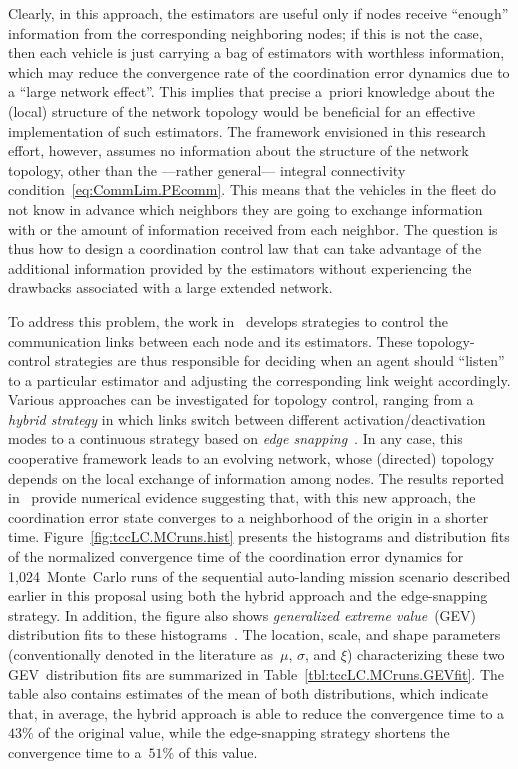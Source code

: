 \documentclass[letter,onecolumn,12pt]{aiaa-tc}
\newcommand{\1}{1_n}
\begin{document}
Clearly, in this approach, the estimators are useful only if nodes receive ``enough'' information from the corresponding neighboring nodes; if this is not the case, then each vehicle is just carrying a bag of estimators with worthless information, which may reduce the convergence rate of the coordination error dynamics due to a ``large network effect''. This implies that precise a~priori knowledge about the (local) structure of the network topology would be beneficial for an effective implementation of such estimators. The framework envisioned in this research effort, however, assumes no information about the structure of the network topology, other than the ---rather general--- integral connectivity condition~\eqref{eq:CommLim.PEcomm}. This means that the vehicles in the fleet do not know in advance which neighbors they are going to exchange information with or the amount of information received from each neighbor. The question is thus how to design a coordination control law that can take advantage of the additional information provided by the estimators without experiencing the drawbacks associated with a large extended network.


To address this problem, the work in~\cite{XargayPhd} develops strategies to control the communication links between each node and its estimators. These topology-control strategies are thus responsible for deciding when an agent should ``listen'' to a particular estimator and adjusting the corresponding link weight accordingly. Various approaches can be investigated for topology control, ranging from a \emph{hybrid strategy} in which links switch between different activation/deactivation modes to a continuous strategy based on \emph{edge snapping}~\cite{TCS10_DeLellis,CHAOS11_DeLellis}. In any case, this cooperative framework leads to an evolving network, whose (directed) topology depends on the local exchange of information among nodes. The results reported in~\cite{XargayPhd} provide numerical evidence suggesting that, with this new approach, the coordination error state converges to a neighborhood of the origin in a shorter time. Figure~\ref{fig:tccLC.MCruns.hist} presents the histograms and distribution fits of the normalized convergence time of the coordination error dynamics for 1,024~Monte~Carlo runs of the sequential auto-landing mission scenario described earlier in this proposal using both the hybrid approach and the edge-snapping strategy. In addition, the figure also shows \emph{generalized extreme value}~(GEV) distribution fits to these histograms~\cite{GEVbook}. The location, scale, and shape parameters (conventionally denoted in the literature as~$\mu$, $\sigma$, and $\xi$) characterizing these two GEV~distribution fits are summarized in Table~\ref{tbl:tccLC.MCruns.GEVfit}. The table also contains estimates of the mean of both distributions, which indicate that, in average, the hybrid approach is able to reduce the convergence time to a~$43\%$ of the original value, while the edge-snapping strategy shortens the convergence time to a~$51\%$ of this value.
\end{document}
